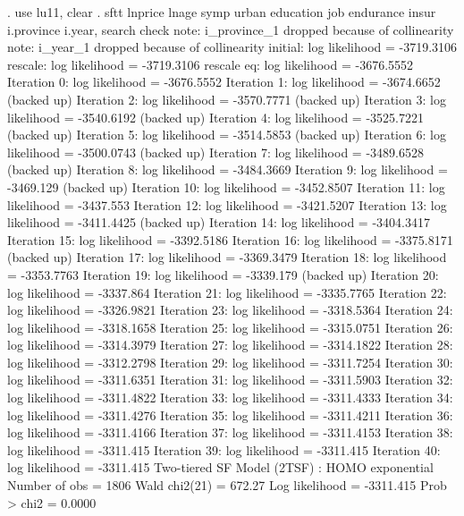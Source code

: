 . use lu11, clear
{\smallskip}
. sftt lnprice lnage symp urban education job endurance insur i.province i.year, search check
note: i_province_1 dropped because of collinearity
note: i_year_1 dropped because of collinearity
{\smallskip}
initial:       log likelihood = -3719.3106
rescale:       log likelihood = -3719.3106
rescale eq:    log likelihood = -3676.5552
Iteration 0:   log likelihood = -3676.5552  
Iteration 1:   log likelihood = -3674.6652  (backed up)
Iteration 2:   log likelihood = -3570.7771  (backed up)
Iteration 3:   log likelihood = -3540.6192  (backed up)
Iteration 4:   log likelihood = -3525.7221  (backed up)
Iteration 5:   log likelihood = -3514.5853  (backed up)
Iteration 6:   log likelihood = -3500.0743  (backed up)
Iteration 7:   log likelihood = -3489.6528  (backed up)
Iteration 8:   log likelihood = -3484.3669  
Iteration 9:   log likelihood =  -3469.129  (backed up)
Iteration 10:  log likelihood = -3452.8507  
Iteration 11:  log likelihood =  -3437.553  
Iteration 12:  log likelihood = -3421.5207  
Iteration 13:  log likelihood = -3411.4425  (backed up)
Iteration 14:  log likelihood = -3404.3417  
Iteration 15:  log likelihood = -3392.5186  
Iteration 16:  log likelihood = -3375.8171  (backed up)
Iteration 17:  log likelihood = -3369.3479  
Iteration 18:  log likelihood = -3353.7763  
Iteration 19:  log likelihood =  -3339.179  (backed up)
Iteration 20:  log likelihood =  -3337.864  
Iteration 21:  log likelihood = -3335.7765  
Iteration 22:  log likelihood = -3326.9821  
Iteration 23:  log likelihood = -3318.5364  
Iteration 24:  log likelihood = -3318.1658  
Iteration 25:  log likelihood = -3315.0751  
Iteration 26:  log likelihood = -3314.3979  
Iteration 27:  log likelihood = -3314.1822  
Iteration 28:  log likelihood = -3312.2798  
Iteration 29:  log likelihood = -3311.7254  
Iteration 30:  log likelihood = -3311.6351  
Iteration 31:  log likelihood = -3311.5903  
Iteration 32:  log likelihood = -3311.4822  
Iteration 33:  log likelihood = -3311.4333  
Iteration 34:  log likelihood = -3311.4276  
Iteration 35:  log likelihood = -3311.4211  
Iteration 36:  log likelihood = -3311.4166  
Iteration 37:  log likelihood = -3311.4153  
Iteration 38:  log likelihood =  -3311.415  
Iteration 39:  log likelihood =  -3311.415  
Iteration 40:  log likelihood =  -3311.415  
{\smallskip}
Two-tiered SF Model (2TSF) : HOMO exponential     Number of obs   =       1806
                                                  Wald chi2(21)   =     672.27
Log likelihood =  -3311.415                       Prob > chi2     =     0.0000
{\smallskip}

